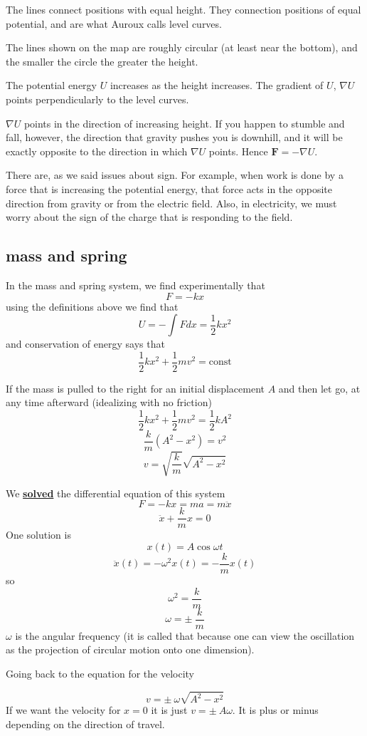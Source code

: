 \documentclass[11pt, oneside]{article}
\begin{document}
The lines connect positions with equal height.  They connection positions of equal potential, and are what Auroux calls level curves.

The lines shown on the map are roughly circular (at least near the bottom), and the smaller the circle the greater the height.

The potential energy $U$ increases as the height increases.  The gradient of $U$, $\nabla U$ points perpendicularly to the level curves.  

$\nabla U$ points in the direction of increasing height.  If you happen to stumble and fall, however, the direction that gravity pushes you is downhill, and it will be exactly opposite to the direction in which $\nabla U$ points.  Hence $\mathbf{F} = - \nabla U$.

There are, as we said issues about sign.  For example, when work is done by a force that is increasing the potential energy, that force acts in the opposite direction from gravity or from the electric field.  Also, in electricity, we must worry about the sign of the charge that is responding to the field.

\subsection*{mass and spring}
In the mass and spring system, we find experimentally that
\[ F = - kx \]
using the definitions above we find that
\[ U = - \int F dx = \frac{1}{2} kx^2 \]
and conservation of energy says that
\[  \frac{1}{2} kx^2 +  \frac{1}{2} mv^2 = \text{const} \]

If the mass is pulled to the right for an initial displacement $A$ and then let go, at any time afterward (idealizing with no friction)
\[ \frac{1}{2} kx^2 +  \frac{1}{2} mv^2 = \frac{1}{2} kA^2 \]
\[ \frac{k}{m}(A^2 - x^2) = v^2 \]
\[ v = \sqrt{\frac{k}{m}} \sqrt{A^2 - x^2} \]

We \hyperref[sec:Harmonic_oscillator]{\textbf{solved}} the differential equation of this system
\[ F = -kx = ma = m \ddot x \]
\[ \ddot x + \frac{k}{m} x = 0 \]
One solution is
\[ x(t) = A \cos \omega t \]
\[ \ddot x(t) = -\omega^2 x(t) = -\frac{k}{m} x(t)\]
so 
\[ \omega^2 = \frac{k}{m} \]
\[ \omega = \pm \ \frac{k}{m} \]
$\omega$ is the angular frequency (it is called that because one can view the oscillation as the projection of circular motion onto one dimension).

Going back to the equation for the velocity

\[ v = \pm \ \omega \sqrt{A^2 - x^2} \]
If we want the velocity for $x = 0$ it is just $v = \pm \ A \omega$.
It is plus or minus depending on the direction of travel.
\end{document}
